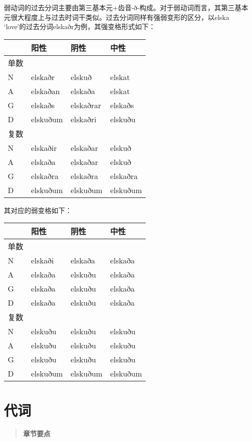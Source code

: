 弱动词的过去分词主要由第三基本元+齿音-ð-构成。对于弱动词而言，其第三基本元很大程度上与过去时词干类似。过去分词同样有强弱变形的区分，以elska
`love‌'的过去分词elskaðr为例，其强变格形式如下：

\begin{longtable}{llll}
\toprule
 & 阳性 & 阴性 & 中性 \\
\midrule
\endhead
\bottomrule
\endfoot
单数 & & & \\
N & elskaðr & elskuð & elskat \\
A & elskaðan & elskaða & elskat \\
G & elskaðs & elskaðrar & elskaðs \\
D & elskuðum & elskaðri & elskuðu \\
复数 & & & \\
N & elskaðir & elskaðar & elskuð \\
A & elskaða & elskaðar & elskuð \\
G & elskaðra & elskaðra & elskaðra \\
D & elskuðum & elskuðum & elskuðum \\
\end{longtable}

其对应的弱变格如下：

\begin{longtable}{llll}
\toprule
 & 阳性 & 阴性 & 中性 \\
\midrule
\endhead
\bottomrule
\endfoot
单数 & & & \\
N & elskaði & elskaða & elskaða \\
A & elskaða & elskuðu & elskaða \\
G & elskaða & elskuðu & elskaða \\
D & elskaða & elskuðu & elskaða \\
复数 & & & \\
N & elskuðu & elskuðu & elskuðu \\
A & elskuðu & elskuðu & elskuðu \\
G & elskuðu & elskuðu & elskuðu \\
D & elskuðum & elskuðum & elskuðum \\
\end{longtable}

\section{代词}\label{ux4ee3ux8bcd}

\begin{quote}
\textbf{章节要点}
\end{quote}

